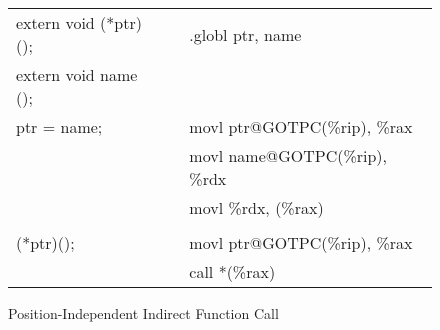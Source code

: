 \begin{figure}[H]
\caption{Position-Independent Indirect Function Call}
\begin{center}
\begin{tabular}{|l|c|l|}
\cline{1-1}\cline{3-3}
extern void (*ptr) ();    &&.globl ptr, name\\
extern void name ();      && \\
ptr = name;               &&movl ptr@GOTPC(\%rip), \%rax  \\
                          &&movl name@GOTPC(\%rip), \%rdx  \\
                          &&movl \%rdx, (\%rax)  \\
                          &&  \\
(*ptr)();                 &&movl ptr@GOTPC(\%rip), \%rax  \\
                          &&call *(\%rax)  \\
\cline{1-1}\cline{3-3}
\end{tabular}
\end{center}
\end{figure}


